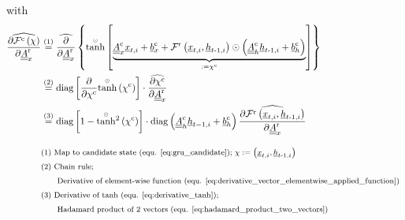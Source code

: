 with
\begin{align} \label{eq:gru_grad_intra_candidate_2_Arx}
    \widehat{
        \frac{\partial \mathcal{F}^\text{c} \left(\chi\right)}
            {\partial \underline{\underline{A}}^\text{r}_x}
    }
    & \overset{\textcolor{black}{(1)}}{=}
    \widehat{
        \frac{\partial}{\partial \underline{\underline{A}}^\text{r}_x} 
    }
    \left\{
        \overset{\scriptscriptstyle \odot}{\tanh} \left[
            \underbrace{
            \underline{\underline A}^\text{c}_{x}
            \underline x_{t,i}
            +
            \underline b^\text{c}_{x}
            +
            \mathcal{F}^\text{r}\left(\underline x_{t, i}, \underline h_{t\text -1, i}\right)
            \odot
            \left(
                \underline{\underline A}^\text{c}_{h}
                \underline h_{t\text -1,i}
                +
                \underline b^\text{c}_{h}
            \right)}_{:=\chi^\text{c}}
        \right]
    \right\}
    \nonumber \\ & \overset{\textcolor{black}{(2)}}{=}
    \mathrm{diag} \left[
        \frac{\partial}{\partial \chi^\text{c}}
        \overset{\scriptscriptstyle \odot}{\tanh} \left(\chi^\text{c}\right)
    \right] 
    \cdot 
    \widehat{
        \frac{\partial \chi^\text{c}}
            {\partial \underline{\underline{A}}^\text{r}_x} 
    }
    \nonumber \\ & \overset{\textcolor{black}{(3)}}{=}
    \mathrm{diag} \left[
        1 - \overset{\scriptscriptstyle \odot}{\tanh}{}^2 \left(\chi^\text{c}\right)
    \right] 
    \cdot
    \mathrm{diag} \left(
        \underline{\underline A}^\text{c}_{h}
        \underline h_{t-1,i}
        +
        \underline b^\text{c}_{h}
    \right)
    \widehat{
        \frac{\partial \mathcal{F}^\text{r}\left(\underline x_{t, i}, \underline h_{t\text -1, i}\right)}
            {\partial \underline{\underline{A}}^\text{r}_x} 
    }
    \\[2ex]
    &\textcolor{black}{\text{\footnotesize (1) 
            Map to candidate state (equ. \ref{eq:gru_candidate}); 
            $\chi :=  \left(\underline x_{t, i}, \underline h_{t\text{-}1, i}\right)$}} \nonumber \\
    &\textcolor{black}{\text{\footnotesize (2) 
        Chain rule;  
    }} \nonumber \\
    &\textcolor{black}{\text{\footnotesize \qquad
        Derivative of element-wise function
        (equ. \ref{eq:derivative_vector_elementwise_applied_function})
    }} \nonumber \\
    &\textcolor{black}{\text{\footnotesize (3) 
        Derivative of tanh (equ. \ref{eq:derivative_tanh}); 
    }} \nonumber \\
    &\textcolor{black}{\text{\footnotesize \qquad
    Hadamard product of 2 vectors (equ. \ref{eq:hadamard_product_two_vectors})
    }} \nonumber
\end{align}
